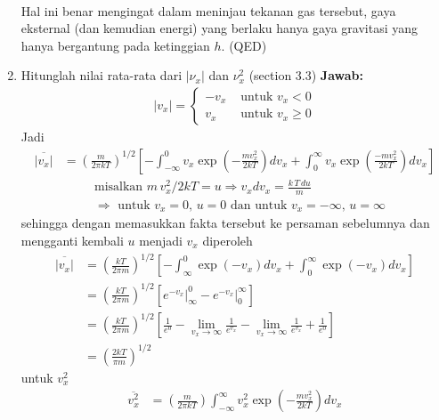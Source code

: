 \documentclass[a4paper , 12 pt]{article}
\begin{document}
\begin{enumerate}
\begin{align}
\end{align}
Hal ini benar mengingat dalam meninjau tekanan gas tersebut, gaya eksternal (dan kemudian energi) yang berlaku hanya gaya gravitasi yang hanya bergantung pada ketinggian $h$. (QED)
\item Hitunglah nilai rata-rata dari $|\nu_x|$ dan $\nu_x^2$ (section  3.3)\newline
\textbf{Jawab:} 
\begin{align}
|v_x|  = \begin{cases}  - v_x  & \text{ untuk } v_x <0 \\
v_x  &\text{ untuk } v_x \ge 0 
\end{cases} 
\nonumber
\end{align}
Jadi 
\begin{align}
\overline{|v_x| } &  = \left(\frac{m}{2 \pi k T}\right)^{1/2} \left [- \int_{-\infty}^{0} v_x \exp \left(-\frac{m v_x^2}{2 kT}\right) dv_x + \int_{0}^{\infty} v_x \exp \left(\frac{- m v_x^2}{2 k T}\right) d v_x \right ] \nonumber 
\end{align}
\begin{align}
& \text{misalkan }
m \, v_x^2 /2 k T = u \Rightarrow v_x d v_x  = \frac{k \, T \,du}{m} \nonumber \\
& \Rightarrow \text{ untuk } v_x = 0 \text{, }  u = 0 \text{ dan untuk } v_x = -\infty \text{, } u  = \infty \nonumber
\end{align}
 sehingga  dengan memasukkan fakta tersebut ke persaman sebelumnya dan  mengganti kembali   $u$  menjadi $v_x$ diperoleh 
\begin{align}
\overline{|v_x|} & =  \left( \frac{k T}{2 \pi m } \right)^{1/2} \left[ - \int_{\infty}^{0} \exp\left( - v_x \right) d v_x  +\int_{0}^{\infty} \exp \left(- v_x\right) d v_x \right ] \nonumber \\
& =    \left( \frac{k T}{2 \pi m } \right)^{1/2} \left[\left. e^{-v_x} \right \vert_{\infty}^0 - \left. e^{-v_x} \right \vert_{0}^{\infty} \right ] \nonumber \\
& =   \left( \frac{k T}{2 \pi m } \right)^{1/2} \left[ \frac{1}{e^0} - \lim_{v_x \rightarrow \infty} \frac{1}{e^{v_x}}  - \lim_{v_x \rightarrow \infty }  \frac{1}{e^{v_x }} + \frac{1}{e^0}\right] \nonumber \\
& =  \left( \frac{ 2k T}{ \pi m } \right)^{1/2} \tag{QED}
\end{align}
untuk $v_x^2$
\begin{align}
\overline{v_x^2} & = \left(\frac{m}{2 \pi k T}\right) \int_{-\infty }^{\infty} v_x^2 \exp \left(- \frac{m v_x^2}{2 k T}\right) d v_x  \nonumber 
\end{align}


\end{enumerate}
\end{document}

